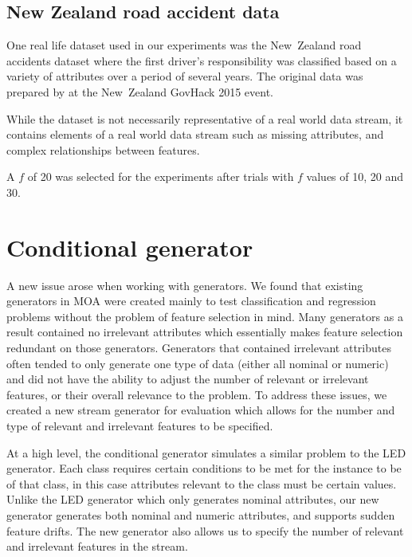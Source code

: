 \subsection{New Zealand road accident data}
One real life dataset used in our experiments was the New~Zealand road accidents dataset where the first driver's responsibility was classified based on a variety of attributes over a period of several years. The original data was prepared by \citet{NZROAD} at the New~Zealand GovHack 2015 event.

While the dataset is not necessarily representative of a real world data stream, it contains elements of a real world data stream such as missing attributes, and complex relationships between features.

A $f$ of 20 was selected for the experiments after trials with $f$ values of 10, 20 and 30.
 
\section{Conditional generator}
A new issue arose when working with generators. We found that existing generators in MOA were created mainly to test classification and regression problems without the problem of feature selection in mind. Many generators as a result contained no irrelevant attributes which essentially makes feature selection redundant on those generators. Generators that contained irrelevant attributes often tended to only generate one type of data (either all nominal or numeric) and did not have the ability to adjust the number of relevant or irrelevant features, or their overall relevance to the problem. To address these issues, we created a new stream generator for evaluation which allows for the number and type of relevant and irrelevant features to be specified.

At a high level, the conditional generator simulates a similar problem to the LED generator. Each class requires certain conditions to be met for the instance to be of that class, in this case attributes relevant to the class must be certain values. Unlike the LED generator which only generates nominal attributes, our new generator generates both nominal and numeric attributes, and supports sudden feature drifts. The new generator also allows us to specify the number of relevant and irrelevant features in the stream.


